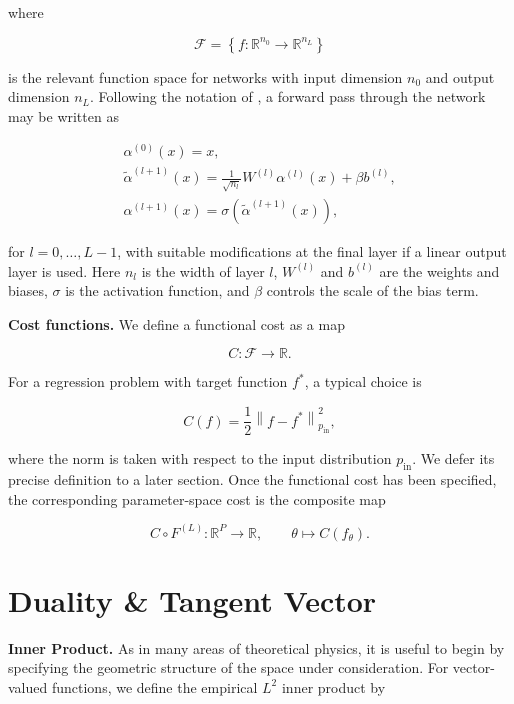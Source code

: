 where

\[
    \mathcal{F}
    =
    \left\{
        f : \mathbb{R}^{n_0} \to \mathbb{R}^{n_L}
    \right\}
\]

is the relevant function space for networks with input dimension \(n_0\) and output dimension \(n_L\). Following the notation of \citet{jacot2018ntk}, a forward pass through the network may be written as

\[
\begin{gathered}
    \alpha^{(0)}(x) = x, \\[0.5em]
    \tilde{\alpha}^{(l+1)}(x)
    =
    \frac{1}{\sqrt{n_l}} W^{(l)} \alpha^{(l)}(x)
    + \beta b^{(l)}, \\[0.5em]
    \alpha^{(l+1)}(x)
    =
    \sigma\!\left(
        \tilde{\alpha}^{(l+1)}(x)
    \right),
\end{gathered}
\]

for \(l = 0,\dots,L-1\), with suitable modifications at the final layer if a linear output layer is used. Here \(n_l\) is the width of layer \(l\), \(W^{(l)}\) and \(b^{(l)}\) are the weights and biases, \(\sigma\) is the activation function, and \(\beta\) controls the scale of the bias term.

\textbf{Cost functions.} We define a functional cost as a map

\[
C : \mathcal{F} \to \mathbb{R}.
\]

For a regression problem with target function \(f^\ast\), a typical choice is

\[
    C(f)
    =
    \frac{1}{2}
    \left\| f - f^\ast \right\|_{p_{\mathrm{in}}}^{2},
\]

where the norm is taken with respect to the input distribution \(p_\text{in}\). We defer its precise definition to a later section. Once the functional cost has been specified, the corresponding parameter-space cost is the composite map

\[
    C \circ F^{(L)}
    :
    \mathbb{R}^{P} \to \mathbb{R},
    \qquad
    \theta
    \mapsto
    C(f_\theta).
\]

\section{Duality \& Tangent Vector}

\textbf{Inner Product.} As in many areas of theoretical physics, it is useful to begin by specifying the geometric structure of the space under consideration. For vector-valued functions, we define the empirical \(L^2\) inner product by

